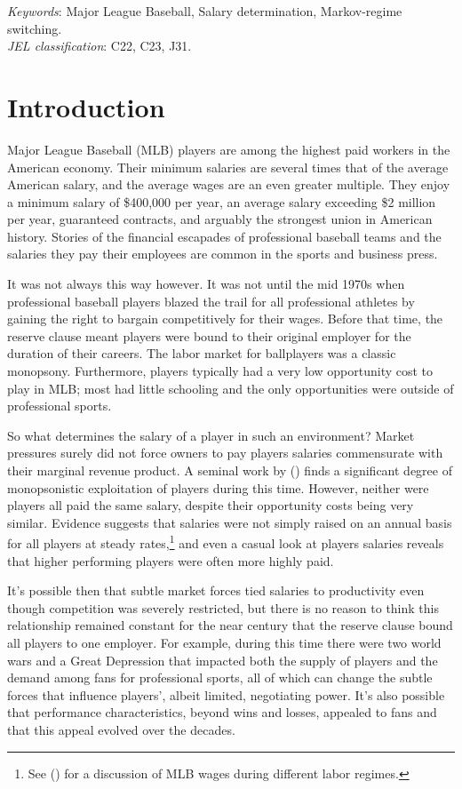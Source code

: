 \documentclass[12pt]{article}
\newcommand{\citee}[1]{\citename{#1} (\citeyear{#1})}
\begin{document}
\begin{titlepage}
\begin{singlespace}
\noindent \textit{Keywords}: Major League Baseball, Salary determination, Markov-regime switching. \\
\noindent \textit{JEL classification}: C22, C23, J31.
\end{singlespace}
\end{titlepage}

\section{Introduction}\label{s:intro}
Major League Baseball (MLB) players are among the highest paid workers in the American economy.  Their minimum salaries are several times that of the average American salary, and the average wages are an even greater multiple.  They enjoy a minimum salary of \$400,000 per year, an average salary exceeding \$2 million per year, guaranteed contracts, and arguably the strongest union in American history.  Stories of the financial escapades of professional baseball teams and the salaries they pay their employees are common in the sports and business press.

It was not always this way however.  It was not until the mid 1970s when professional baseball players blazed the trail for all professional athletes by gaining the right to bargain competitively for their wages.  Before that time, the reserve clause meant players were bound to their original employer for the duration of their careers.  The labor market for ballplayers was a classic monopsony.  Furthermore, players typically had a very low opportunity cost to play in MLB; most had little schooling and the only opportunities were outside of professional sports.  

So what determines the salary of a player in such an environment?  Market pressures surely did not force owners to pay players salaries commensurate with their marginal revenue product.  A seminal work by \citee{scully1974} finds a significant degree of monopsonistic exploitation of players during this time.  However, neither were players all paid the same salary, despite their opportunity costs being very similar.  Evidence suggests that salaries were not simply raised on an annual basis for all players at steady rates,\footnote{See \citee{haupert2009} for a discussion of MLB wages during different labor regimes.} and even a casual look at players salaries reveals that higher performing players were often more highly paid.  

It's possible then that subtle market forces tied salaries to productivity even though competition was severely restricted, but there is no reason to think this relationship remained constant for the near century that the reserve clause bound all players to one employer.  For example, during this time there were two world wars and a Great Depression that impacted both the supply of players and the demand among fans for professional sports, all of which can change the subtle forces that influence players', albeit limited, negotiating power.  It's also possible that performance characteristics, beyond wins and losses, appealed to fans and that this appeal evolved over the decades. 
\end{document}
